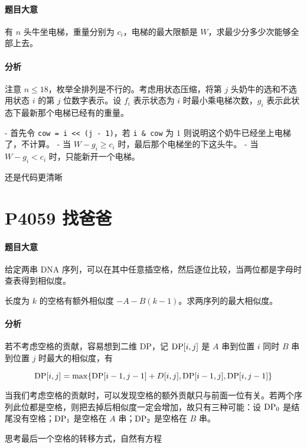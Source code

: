 \paragraph{题目大意}

有 $n$ 头牛坐电梯，重量分别为 $c_i$，电梯的最大限额是 $W$，求最少分多少次能够全部上去。

\paragraph{分析}

注意 $n \leqslant 18$，枚举全排列是不行的。考虑用状态压缩，将第 $j$ 头奶牛的选和不选用状态 $i$ 的第 $j$ 位数字表示。设 $f_i$ 表示状态为 $i$ 时最小乘电梯次数，$g_i$ 表示此状态下最新那个电梯已经有的重量。

- 首先令 \verb`cow = i << (j - 1)`，若 \verb`i & cow` 为 $1$ 则说明这个奶牛已经坐上电梯了，不计算。
- 当 $W - g_i \geqslant c_i$ 时，最后那个电梯坐的下这头牛。
- 当 $W - g_i < c_i$ 时，只能新开一个电梯。

还是代码更清晰

\section{P4059 找爸爸}

\paragraph{题目大意}

给定两串 DNA 序列，可以在其中任意插空格，然后逐位比较，当两位都是字母时查表得到相似度。

长度为 $k$ 的空格有额外相似度 $- A - B(k - 1)$。求两序列的最大相似度。

\paragraph{分析}

若不考虑空格的贡献，容易想到二维 DP，记 ${\rm DP}[i,j]$ 是 $A$ 串到位置 $i$ 同时 $B$ 串到位置 $j$ 时最大的相似度，有

\[ {\rm DP}[i, j] = \max\{ {\rm DP}[i - 1, j - 1] + D[i, j], {\rm DP}[i - 1, j], {\rm DP}[i, j - 1] \} \]

当我们考虑空格的贡献时，可以发现空格的额外贡献只与前面一位有关。若两个序列此位都是空格，则把去掉后相似度一定会增加，故只有三种可能：设 ${\rm DP}_0$ 是结尾没有空格；${\rm DP}_1$ 是空格在 $A$ 串；${\rm DP}_2$ 是空格在 $B$ 串。

思考最后一个空格的转移方式，自然有方程

